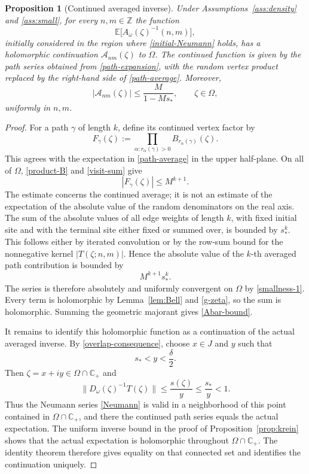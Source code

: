 \documentclass[12pt,a4paper]{article}
\numberwithin{equation}{section}
\newcommand{\E}{\mathbb E}
\newcommand{\C}{\mathbb C}
\newcommand{\Z}{\mathbb Z}
\newcommand{\cA}{\mathcal A}
\newcommand{\Om}{\Omega}
\newtheorem{prop}[thm]{Proposition}
\begin{document}
\begin{prop}[Continued averaged inverse]\label{prop:continued-inverse}
Under Assumptions~\ref{ass:density} and \ref{ass:small}, for every
$n,m\in\Z$ the function
$$
\E\bigl[A_\omega(\zeta)^{-1}(n,m)\bigr],
$$
initially considered in the region where \eqref{initial-Neumann} holds,
has a holomorphic continuation $\cA_{nm}(\zeta)$ to $\Om$.  The continued
function is given by the path series obtained from \eqref{path-expansion},
with the random vertex product replaced by the right-hand side of
\eqref{path-average}.  Moreover,
\begin{equation}
|\cA_{nm}(\zeta)|
\le\frac{M}{1-Ms_*},
\qquad \zeta\in\Om,
\label{Abar-bound}
\end{equation}
uniformly in $n,m$.
\end{prop}

\begin{proof}
For a path $\gamma$ of length $k$, define its continued vertex factor by
\begin{equation}
 F_\gamma(\zeta)
 :=\prod_{\alpha:r_\alpha(\gamma)>0}
 B_{r_\alpha(\gamma)}(\zeta).
\label{continued-vertex}
\end{equation}
This agrees with the expectation in \eqref{path-average} in the upper
half-plane.  On all of $\Om$, \eqref{product-B} and \eqref{visit-sum} give
\begin{equation}
 |F_\gamma(\zeta)|\le M^{k+1}.
\label{vertex-bound}
\end{equation}
The estimate concerns the continued average; it is not an estimate of the
expectation of the absolute value of the random denominators on the real axis.
The sum of the absolute values of all edge weights of length $k$, with fixed
initial site and with the terminal site either fixed or summed over, is
bounded by $s_*^k$.  This follows either by
iterated convolution or by the row-sum bound for the nonnegative kernel
$|T(\zeta;n,m)|$.  Hence the absolute value of the $k$-th averaged path
contribution is bounded by
$$
M^{k+1}s_*^k.
$$
The series is therefore absolutely and uniformly convergent on $\Om$ by
\eqref{smallness-1}.  Every term is holomorphic by
Lemma~\ref{lem:Bell} and \eqref{g-zeta}, so the sum is holomorphic.
Summing the geometric majorant gives \eqref{Abar-bound}.

It remains to identify this holomorphic function as a continuation of the
actual averaged inverse.  By \eqref{overlap-consequence}, choose $x\in J$
and $y$ such that
$$
s_*<y<\frac{\delta}{2}.
$$
Then $\zeta=x+iy\in\Om\cap\C_+$ and
$$
\|D_\omega(\zeta)^{-1}T(\zeta)\|
\le\frac{s(\zeta)}{y}
\le\frac{s_*}{y}<1.
$$
Thus the Neumann series \eqref{Neumann} is valid in a neighborhood of this
point contained in $\Om\cap\C_+$, and there the continued path series equals
the actual expectation.  The uniform inverse bound in the proof of Proposition~\ref{prop:krein}
shows that the actual expectation is holomorphic throughout
$\Om\cap\C_+$.  The identity theorem therefore gives equality on that
connected set and identifies the continuation uniquely.
\end{proof}
\end{document}
